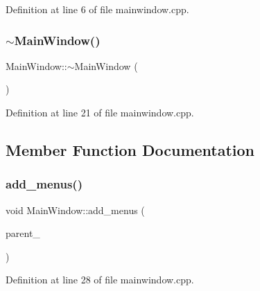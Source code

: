 Definition at line 6 of file mainwindow.\+cpp.

\mbox{\label{classMainWindow_ae98d00a93bc118200eeef9f9bba1dba7}} 
\subsubsection{\texorpdfstring{$\sim$\+Main\+Window()}{~MainWindow()}}
{\footnotesize\ttfamily Main\+Window\+::$\sim$\+Main\+Window (\begin{DoxyParamCaption}{ }\end{DoxyParamCaption})}



Definition at line 21 of file mainwindow.\+cpp.



\subsection{Member Function Documentation}
\mbox{\label{classMainWindow_a465314c6317877838dfe332838be19b2}} 
\subsubsection{\texorpdfstring{add\+\_\+menus()}{add\_menus()}}
{\footnotesize\ttfamily void Main\+Window\+::add\+\_\+menus (\begin{DoxyParamCaption}\item[{Q\+Widget $\ast$}]{parent\+\_\+ }\end{DoxyParamCaption})\hspace{0.3cm}{\ttfamily [private]}}



Definition at line 28 of file mainwindow.\+cpp.

